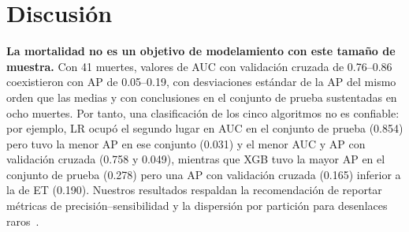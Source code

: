 \documentclass[healthcare,article,submit,pdftex,moreauthors]{Definitions/mdpi_es}
\begin{document}
\section{Discusión}\label{sec:discussion}
\textbf{La mortalidad no es un objetivo de modelamiento con este tamaño de muestra.} Con 41 muertes,
valores de AUC con validación cruzada de 0.76--0.86 coexistieron con AP de 0.05--0.19, con
desviaciones estándar de la AP del mismo orden que las medias y con conclusiones en el conjunto de prueba
sustentadas en ocho muertes. Por tanto, una clasificación de los cinco algoritmos no es
confiable: por ejemplo, LR ocupó el segundo lugar en AUC en el conjunto de prueba (0.854) pero tuvo la menor AP en ese conjunto (0.031) y el menor
AUC y AP con validación cruzada (0.758 y 0.049), mientras que XGB tuvo la mayor AP en el conjunto de prueba (0.278)
pero una AP con validación cruzada (0.165) inferior a la de ET (0.190). Nuestros resultados
respaldan la recomendación de reportar métricas de precisión--sensibilidad y la
dispersión por partición para desenlaces raros~\cite{Marshall2023Imbalance,Saito2015PR}.
\end{document}
